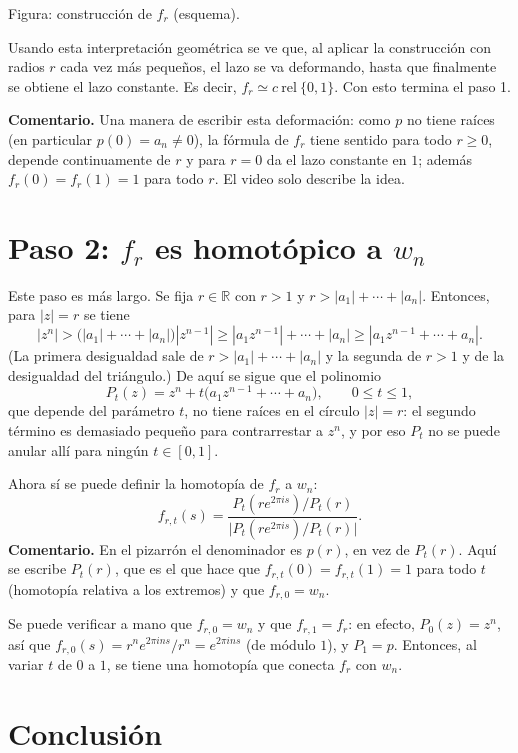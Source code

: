 \documentclass[11pt]{article}
\begin{document}
\noindent Figura: construcción de $f_r$ (esquema).

\medskip
Usando esta interpretación geométrica se ve que, al aplicar la construcción con radios $r$ cada vez más pequeños, el lazo se va deformando, hasta que finalmente se obtiene el lazo constante. Es decir, $f_r\simeq c\ \mathrm{rel}\ \{0,1\}$. Con esto termina el paso 1.

\medskip\noindent\textbf{Comentario.} Una manera de escribir esta deformación: como $p$ no tiene raíces (en particular $p(0)=a_n\neq 0$), la fórmula de $f_r$ tiene sentido para todo $r\ge 0$, depende continuamente de $r$ y para $r=0$ da el lazo constante en $1$; además $f_r(0)=f_r(1)=1$ para todo $r$. El video solo describe la idea.

\section*{Paso 2: $f_r$ es homotópico a $w_n$}

Este paso es más largo. Se fija $r\in\mathbb{R}$ con $r>1$ y $r>|a_1|+\cdots+|a_n|$. Entonces, para $|z|=r$ se tiene
\[
  |z^n|>\bigl(|a_1|+\cdots+|a_n|\bigr)|z^{n-1}|
  \ge |a_1z^{n-1}|+\cdots+|a_n|
  \ge |a_1z^{n-1}+\cdots+a_n|.
\]
(La primera desigualdad sale de $r>|a_1|+\cdots+|a_n|$ y la segunda de $r>1$ y de la desigualdad del triángulo.) De aquí se sigue que el polinomio
\[
  P_t(z)=z^n+t\bigl(a_1z^{n-1}+\cdots+a_n\bigr),\qquad 0\le t\le 1,
\]
que depende del parámetro $t$, no tiene raíces en el círculo $|z|=r$: el segundo término es demasiado pequeño para contrarrestar a $z^n$, y por eso $P_t$ no se puede anular allí para ningún $t\in[0,1]$.

Ahora sí se puede definir la homotopía de $f_r$ a $w_n$:
\[
  f_{r,t}(s)=\frac{P_t(re^{2\pi i s})/P_t(r)}{\bigl|P_t(re^{2\pi i s})/P_t(r)\bigr|}.
\]
\textbf{Comentario.} En el pizarrón el denominador es $p(r)$, en vez de $P_t(r)$. Aquí se escribe $P_t(r)$, que es el que hace que $f_{r,t}(0)=f_{r,t}(1)=1$ para todo $t$ (homotopía relativa a los extremos) y que $f_{r,0}=w_n$.

Se puede verificar a mano que $f_{r,0}=w_n$ y que $f_{r,1}=f_r$: en efecto, $P_0(z)=z^n$, así que $f_{r,0}(s)=r^ne^{2\pi i n s}/r^n=e^{2\pi i n s}$ (de módulo $1$), y $P_1=p$. Entonces, al variar $t$ de $0$ a $1$, se tiene una homotopía que conecta $f_r$ con $w_n$.

\section*{Conclusión}
\end{document}
